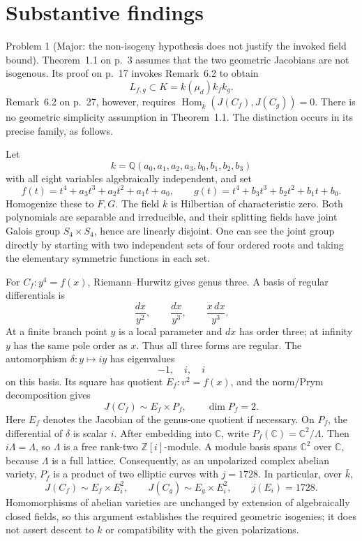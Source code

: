 \documentclass[10pt]{article}
\begin{document}
\section*{Substantive findings}
Problem 1 (Major: the non-isogeny hypothesis does not justify the invoked field bound).  Theorem 1.1 on p. 3 assumes that the two geometric Jacobians are not isogenous. Its proof on p. 17 invokes Remark 6.2 to obtain \[L_{f,g}\subset K=k(\mu_d)k_fk_g.\] Remark 6.2 on p. 27, however, requires \(\mathop{\mathrm{Hom}}_{\bar k}(J(C_f),J(C_g))=0\). There is no geometric simplicity assumption in Theorem 1.1. The distinction occurs in its precise family, as follows.\par
Let \[k=\mathbb{Q}(a_0,a_1,a_2,a_3,b_0,b_1,b_2,b_3)\] with all eight variables algebraically independent, and set \[f(t)=t^4+a_3t^3+a_2t^2+a_1t+a_0,\qquad
 g(t)=t^4+b_3t^3+b_2t^2+b_1t+b_0.\] Homogenize these to \(F,G\). The field \(k\) is Hilbertian of characteristic zero. Both polynomials are separable and irreducible, and their splitting fields have joint Galois group \(S_4\times S_4\), hence are linearly disjoint. One can see the joint group directly by starting with two independent sets of four ordered roots and taking the elementary symmetric functions in each set.\par
For \(C_f:y^4=f(x)\), Riemann–Hurwitz gives genus three. A basis of regular differentials is \[\frac{dx}{y^2},\qquad \frac{dx}{y^3},\qquad
 \frac{x\,dx}{y^3}.\] At a finite branch point \(y\) is a local parameter and \(dx\) has order three; at infinity \(y\) has the same pole order as \(x\). Thus all three forms are regular. The automorphism \(\delta:y\mapsto iy\) has eigenvalues \[-1,\quad i,\quad i\] on this basis. Its square has quotient \(E_f:v^2=f(x)\), and the norm/Prym decomposition gives \[J(C_f)\sim E_f\times P_f,\qquad \dim P_f=2.\] Here \(E_f\) denotes the Jacobian of the genus-one quotient if necessary. On \(P_f\), the differential of \(\delta\) is scalar \(i\). After embedding into \(\mathbb{C}\), write \(P_f(\mathbb{C})=\mathbb{C}^2/\Lambda\). Then \(i\Lambda=\Lambda\), so \(\Lambda\) is a free rank-two \(\mathbb{Z}[i]\)-module. A module basis spans \(\mathbb{C}^2\) over \(\mathbb{C}\), because \(\Lambda\) is a full lattice. Consequently, as an unpolarized complex abelian variety, \(P_f\) is a product of two elliptic curves with \(j=1728\). In particular, over \(\bar k\), \[J(C_f)\sim E_f\times E_i^2,\qquad
 J(C_g)\sim E_g\times E_i^2,\qquad j(E_i)=1728.\] Homomorphisms of abelian varieties are unchanged by extension of algebraically closed fields, so this argument establishes the required geometric isogenies; it does not assert descent to \(k\) or compatibility with the given polarizations.\par
\end{document}

